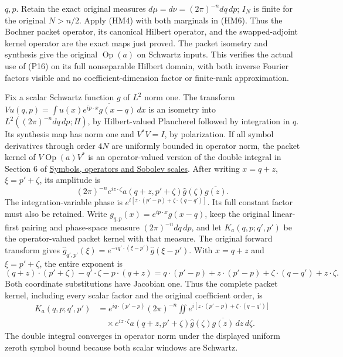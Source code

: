 \documentclass[
  11pt,
]{article}
\begin{document}
\(q,p\). Retain the exact original measures
\(d\mu=d\nu=(2\pi)^{-n}dq\,dp\); \(I_N\) is finite for the original
\(N>n/2\). Apply (HM4) with both marginals in (HM6). Thus the Bochner
packet operator, its canonical Hilbert operator, and the swapped-adjoint
kernel operator are the exact maps just proved. The packet isometry and
synthesis give the original \(\operatorname{Op}(a)\) on Schwartz inputs.
This verifies the actual use of (P16) on its full nonseparable Hilbert
domain, with both inverse Fourier factors visible and no
coefficient-dimension factor or finite-rank approximation.

Fix a scalar Schwartz function \(g\) of \(L^2\) norm one. The transform
\(Vu(q,p)=\int u(x)\overline{e^{ip\cdot x}g(x-q)}\,dx\) is an isometry
into \(L^2((2\pi)^{-n}dq\,dp;H)\), by Hilbert-valued Plancherel followed
by integration in \(q\). Its synthesis map has norm one and \(V^*V=I\),
by polarization. If all symbol derivatives through order \(4N\) are
uniformly bounded in operator norm, the packet kernel of
\(V\operatorname{Op}(a)V^*\) is an operator-valued version of the double
integral in Section 6 of \href{euclidean-symbol-calculus.pdf}{Symbols,
operators and Sobolev scales}. After writing \(x=q+z\),
\(\xi=p'+\zeta\), its amplitude is \[
 (2\pi)^{-n}e^{iz\cdot\zeta}
 a(q+z,p'+\zeta)\widehat g(\zeta)\overline{g(z)}.
\tag{P17}
\] The integration-variable phase is
\(e^{i[z\cdot(p'-p)+\zeta\cdot(q-q')]}\). Its full constant factor must
also be retained. Write \(g_{q,p}(x)=e^{ip\cdot x}g(x-q)\), keep the
original linear-first pairing and phase-space measure
\((2\pi)^{-n}dq\,dp\), and let \(K_a(q,p;q',p')\) be the operator-valued
packet kernel with that measure. The original forward transform gives
\(\widehat g_{q',p'}(\xi)=e^{-iq'\cdot(\xi-p')}\widehat g(\xi-p')\).
With \(x=q+z\) and \(\xi=p'+\zeta\), the entire exponent is \[
 (q+z)\cdot(p'+\zeta)-q'\cdot\zeta-p\cdot(q+z)
 =q\cdot(p'-p)+z\cdot(p'-p)
                      +\zeta\cdot(q-q')+z\cdot\zeta.
 \tag{P17a}
\] Both coordinate substitutions have Jacobian one. Thus the complete
packet kernel, including every scalar factor and the original
coefficient order, is \[
 \begin{split}
 K_a(q,p;q',p')&=e^{iq\cdot(p'-p)}(2\pi)^{-n}
    \iint e^{i[z\cdot(p'-p)+\zeta\cdot(q-q')]}\\
 &\quad{}\times e^{iz\cdot\zeta}
       a(q+z,p'+\zeta)\widehat g(\zeta)\overline{g(z)}\,dz\,d\zeta.
 \end{split}
 \tag{P17b}
\] The double integral converges in operator norm under the displayed
uniform zeroth symbol bound because both scalar windows are Schwartz.
\end{document}
